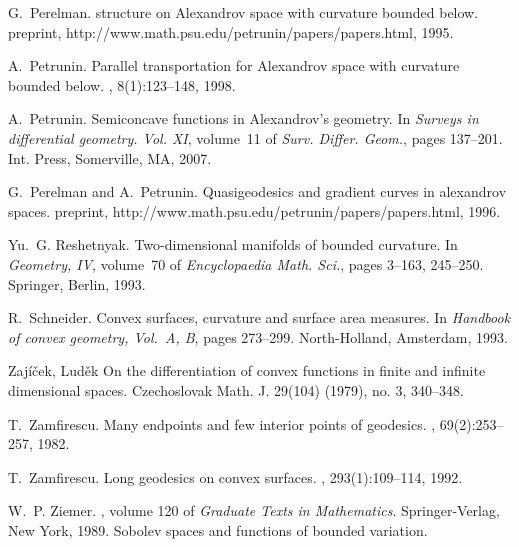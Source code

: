 \documentclass[12pt,leqno,intlimits]{amsart}
\numberwithin{equation}{section}
\theoremstyle{definition}
\theoremstyle{remark}
\begin{document}
\begin{thebibliography}{KMS01}
G.~Perelman.
 structure on {A}lexandrov space with curvature bounded below.
\newblock preprint, http://www.math.psu.edu/petrunin/papers/papers.html, 1995.

A.~Petrunin.
\newblock Parallel transportation for {A}lexandrov space with curvature bounded
below.
, 8(1):123--148, 1998.

A.~Petrunin.
\newblock Semiconcave functions in {A}lexandrov's geometry.
\newblock In {\em Surveys in differential geometry. {V}ol. {XI}}, volume~11 of
{\em Surv. Differ. Geom.}, pages 137--201. Int. Press, Somerville, MA, 2007.

G.~Perelman and A.~Petrunin.
\newblock Quasigeodesics and gradient curves in alexandrov spaces.
\newblock preprint, http://www.math.psu.edu/petrunin/papers/papers.html, 1996.

Yu.~G. Reshetnyak.
\newblock Two-dimensional manifolds of bounded curvature.
\newblock In {\em Geometry, {IV}}, volume~70 of {\em Encyclopaedia Math. Sci.},
pages 3--163, 245--250. Springer, Berlin, 1993.

R.~Schneider.
\newblock Convex surfaces, curvature and surface area measures.
\newblock In {\em Handbook of convex geometry, {V}ol.\ {A}, {B}}, pages
273--299. North-Holland, Amsterdam, 1993.

Zaj\'i\v{c}ek, Lud\v{e}k
On the differentiation of convex functions in finite and infinite dimensional spaces.
Czechoslovak Math. J. 29(104) (1979), no. 3, 340--348.

T.~Zamfirescu.
\newblock Many endpoints and few interior points of geodesics.
, 69(2):253--257, 1982.

T.~Zamfirescu.
\newblock Long geodesics on convex surfaces.
, 293(1):109--114, 1992.

W.~P. Ziemer.
, volume 120 of {\em Graduate
Texts in Mathematics}.
\newblock Springer-Verlag, New York, 1989.
\newblock Sobolev spaces and functions of bounded variation.

\end{thebibliography}
\end{document}
